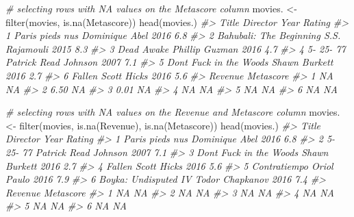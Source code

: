 \documentclass[
]{book}
\newenvironment{Shaded}{\begin{snugshade}}{\end{snugshade}}
\newcommand{\CommentTok}[1]{\textcolor[rgb]{0.56,0.35,0.01}{\textit{#1}}}
\newcommand{\FunctionTok}[1]{\textcolor[rgb]{0.00,0.00,0.00}{#1}}
\newcommand{\NormalTok}[1]{#1}
\newcommand{\OtherTok}[1]{\textcolor[rgb]{0.56,0.35,0.01}{#1}}
\begin{document}
\begin{Shaded}
\begin{Highlighting}[]
\CommentTok{\# selecting rows with NA values on the Metascore column}
\NormalTok{movies. }\OtherTok{\textless{}{-}} \FunctionTok{filter}\NormalTok{(movies, }\FunctionTok{is.na}\NormalTok{(Metascore))}
\FunctionTok{head}\NormalTok{(movies.)}
\CommentTok{\#\textgreater{}                     Title             Director Year Rating}
\CommentTok{\#\textgreater{} 1         Paris pieds nus       Dominique Abel 2016    6.8}
\CommentTok{\#\textgreater{} 2 Bahubali: The Beginning       S.S. Rajamouli 2015    8.3}
\CommentTok{\#\textgreater{} 3              Dead Awake       Phillip Guzman 2016    4.7}
\CommentTok{\#\textgreater{} 4               5{-} 25{-} 77 Patrick Read Johnson 2007    7.1}
\CommentTok{\#\textgreater{} 5 Don\textquotesingle{}t Fuck in the Woods        Shawn Burkett 2016    2.7}
\CommentTok{\#\textgreater{} 6                  Fallen          Scott Hicks 2016    5.6}
\CommentTok{\#\textgreater{}   Revenue Metascore}
\CommentTok{\#\textgreater{} 1      NA        NA}
\CommentTok{\#\textgreater{} 2    6.50        NA}
\CommentTok{\#\textgreater{} 3    0.01        NA}
\CommentTok{\#\textgreater{} 4      NA        NA}
\CommentTok{\#\textgreater{} 5      NA        NA}
\CommentTok{\#\textgreater{} 6      NA        NA}

\CommentTok{\# selecting rows with NA values on the Revenue and Metascore column}
\NormalTok{movies. }\OtherTok{\textless{}{-}} \FunctionTok{filter}\NormalTok{(movies, }\FunctionTok{is.na}\NormalTok{(Revenue), }\FunctionTok{is.na}\NormalTok{(Metascore))}
\FunctionTok{head}\NormalTok{(movies.)}
\CommentTok{\#\textgreater{}                     Title             Director Year Rating}
\CommentTok{\#\textgreater{} 1         Paris pieds nus       Dominique Abel 2016    6.8}
\CommentTok{\#\textgreater{} 2               5{-} 25{-} 77 Patrick Read Johnson 2007    7.1}
\CommentTok{\#\textgreater{} 3 Don\textquotesingle{}t Fuck in the Woods        Shawn Burkett 2016    2.7}
\CommentTok{\#\textgreater{} 4                  Fallen          Scott Hicks 2016    5.6}
\CommentTok{\#\textgreater{} 5            Contratiempo          Oriol Paulo 2016    7.9}
\CommentTok{\#\textgreater{} 6    Boyka: Undisputed IV      Todor Chapkanov 2016    7.4}
\CommentTok{\#\textgreater{}   Revenue Metascore}
\CommentTok{\#\textgreater{} 1      NA        NA}
\CommentTok{\#\textgreater{} 2      NA        NA}
\CommentTok{\#\textgreater{} 3      NA        NA}
\CommentTok{\#\textgreater{} 4      NA        NA}
\CommentTok{\#\textgreater{} 5      NA        NA}
\CommentTok{\#\textgreater{} 6      NA        NA}


\end{Highlighting}
\end{Shaded}
\end{document}
